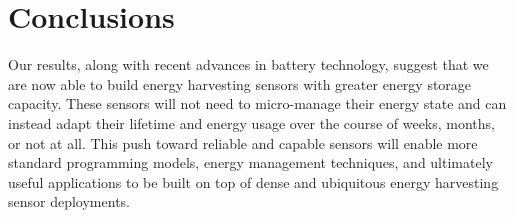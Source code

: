\section{Conclusions}
\label{sec:conc}

%


Our results, along with recent advances in battery technology, suggest that we
are now able to build energy harvesting sensors with greater energy storage
capacity. These sensors will not need to micro-manage their energy state and
can instead adapt their lifetime and energy usage over
the course of weeks, months, or not at all. This push toward
reliable and capable sensors will enable more standard programming models,
energy management techniques, and ultimately useful applications to be built on
top of dense and ubiquitous energy harvesting sensor deployments.
